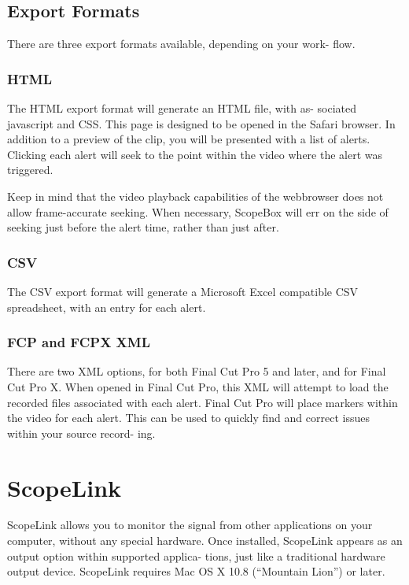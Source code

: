 \documentclass[10,letterpaper,]{report}
\begin{document}
\section{Export Formats}

There are three export formats available, depending on your work- flow.

\subsection{HTML}

The HTML export format will generate an HTML file, with as- sociated
javascript and CSS. This page is designed to be opened in the Safari
browser. In addition to a preview of the clip, you will be presented
with a list of alerts. Clicking each alert will seek to the point within
the video where the alert was triggered.

Keep in mind that the video playback capabilities of the webbrowser does
not allow frame-accurate seeking. When necessary, ScopeBox will err on
the side of seeking just before the alert time, rather than just after.

\subsection{CSV}

The CSV export format will generate a Microsoft Excel compatible CSV
spreadsheet, with an entry for each alert.

\subsection{FCP and FCPX XML}

There are two XML options, for both Final Cut Pro 5 and later, and for
Final Cut Pro X. When opened in Final Cut Pro, this XML will attempt to
load the recorded files associated with each alert. Final Cut Pro will
place markers within the video for each alert. This can be used to
quickly find and correct issues within your source record- ing.

\chapter{ScopeLink}

ScopeLink allows you to monitor the signal from other applications on
your computer, without any special hardware. Once installed, ScopeLink
appears as an output option within supported applica- tions, just like a
traditional hardware output device. ScopeLink requires Mac OS X 10.8
(``Mountain Lion'') or later.
\end{document}
